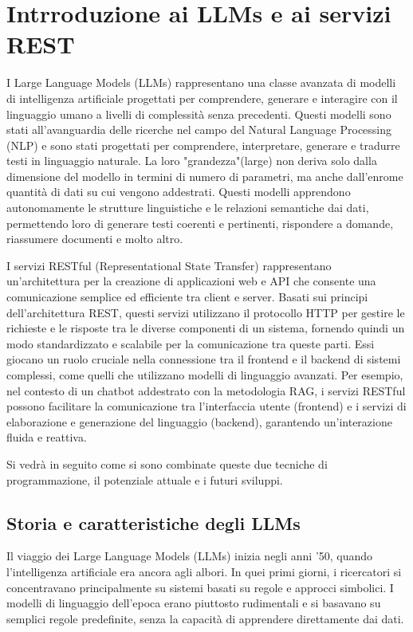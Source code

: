 \documentclass[a4paper,twoside,12pt]{toptesi}
\begin{document}
\chapter{Intrroduzione ai LLMs e ai servizi REST}

I Large Language Models (LLMs) rappresentano una classe avanzata di modelli di intelligenza artificiale progettati per comprendere, generare e interagire con il linguaggio umano a livelli di complessità senza precedenti. Questi modelli sono stati all’avanguardia delle ricerche nel campo del Natural Language Processing (NLP) e sono stati progettati per comprendere, interpretare, generare e tradurre testi in linguaggio naturale. La loro "grandezza"(large) non deriva solo dalla dimensione del modello in termini di numero di parametri, ma anche dall’enrome quantità di dati su cui vengono addestrati. Questi modelli apprendono autonomamente le strutture linguistiche e le relazioni semantiche dai dati, permettendo loro di generare testi coerenti e pertinenti, rispondere a domande, riassumere documenti e molto altro.

I servizi RESTful (Representational State Transfer) rappresentano un'architettura per la creazione di applicazioni web e API che consente una comunicazione semplice ed efficiente tra client e server. Basati sui principi dell'architettura REST, questi servizi utilizzano il protocollo HTTP per gestire le richieste e le risposte tra le diverse componenti di un sistema, fornendo quindi un modo standardizzato e scalabile per la comunicazione tra queste parti. Essi giocano un ruolo cruciale nella connessione tra il frontend e il backend di sistemi complessi, come quelli che utilizzano modelli di linguaggio avanzati. Per esempio, nel contesto di un chatbot addestrato con la metodologia RAG, i servizi RESTful possono facilitare la comunicazione tra l'interfaccia utente (frontend) e i servizi di elaborazione e generazione del linguaggio (backend), garantendo un'interazione fluida e reattiva.

Si vedrà in seguito come si sono combinate queste due tecniche di programmazione, il potenziale attuale e i futuri sviluppi.

\section{Storia e caratteristiche degli LLMs}
Il viaggio dei Large Language Models (LLMs) inizia negli anni ’50, quando l'intelligenza artificiale era ancora agli albori. In quei primi giorni, i ricercatori si concentravano principalmente su sistemi basati su regole e approcci simbolici. I modelli di linguaggio dell'epoca erano piuttosto rudimentali e si basavano su semplici regole predefinite, senza la capacità di apprendere direttamente dai dati.
\end{document}
